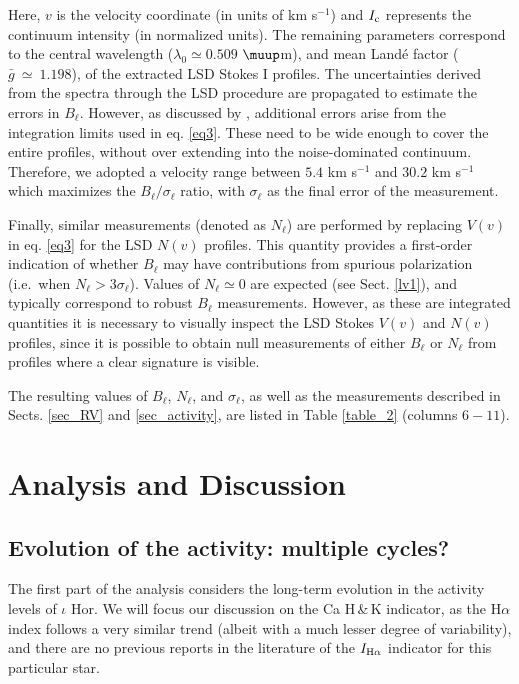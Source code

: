 \documentclass[a4paper,fleqn,usenatbib]{mnras}
\begin{document}
\noindent Here, $v$ is the velocity coordinate (in units of km s$^{-1}$) and $I_{\rm c}$ represents the continuum intensity (in normalized units). The remaining parameters correspond to the central wavelength ($\lambda_0 \simeq 0.509$ $\muup$m), and mean Land\'e factor ($\bar{g}~\simeq~1.198$), of the extracted LSD Stokes I profiles. The uncertainties derived from the spectra through the LSD procedure are propagated to estimate the errors in $B _{\ell}$. However, as discussed by , additional errors arise from the integration limits used in eq. \ref{eq3}. These need to be wide enough to cover the entire profiles, without over extending into the noise-dominated continuum. Therefore, we adopted a velocity range between $5.4$ km s$^{-1}$ and $30.2$ km s$^{-1}$ which maximizes the $B _{\ell}/\sigma_{\ell}$ ratio, with $\sigma_{\ell}$ as the final error of the measurement.     

Finally, similar measurements (denoted as $N_{\ell}$) are performed by replacing $V(v)$ in eq. \ref{eq3} for the LSD $N(v)$ profiles. This quantity provides a first-order indication of whether $B_{\ell}$ may have contributions from spurious polarization (i.e.~when $N_{\ell} > 3\sigma_{\ell}$). Values of $N_{\ell} \simeq 0$ are expected (see Sect. \ref{lv1}), and typically correspond to robust $B_{\ell}$ measurements. However, as these are integrated quantities it is necessary to visually inspect the LSD Stokes $V(v)$ and $N(v)$ profiles, since it is possible to obtain null measurements of either $B_{\ell}$ or $N_{\ell}$ from profiles where a clear signature is visible. 

The resulting values of $B_{\ell}$,  $N_{\ell}$, and $\sigma_{\ell}$, as well as the measurements described in Sects. \ref{sec_RV} and \ref{sec_activity}, are listed in Table \ref {table_2} (columns $6 - 11$).

\section{Analysis and Discussion}\label{sect_5}

\subsection{Evolution of the activity: multiple cycles?}\label{sec_cycles}

\noindent The first part of the analysis considers the long-term evolution in the activity levels of $\iota$ Hor. We will focus our discussion on the Ca H\,\&\,K indicator, as the H$\alpha$ index follows a very similar trend (albeit with a much lesser degree of variability), and there are no previous reports in the literature of the $I_{\rm H\alpha}$ indicator for this particular star. 
\end{document}
